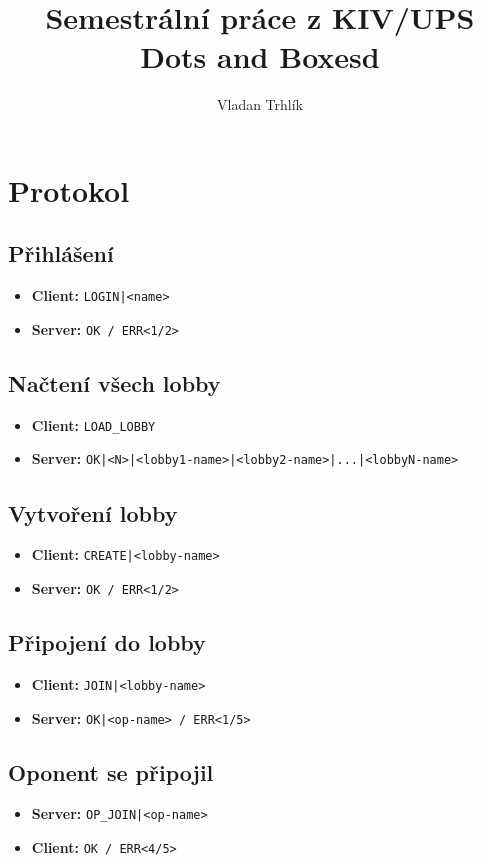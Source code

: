 \documentclass[11pt,a4paper]{article}
\author{Vladan Trhlík}
\title{%
	Semestrální práce z KIV/UPS \\
	\large Dots and Boxesd  \\
}
\begin{document}
\maketitle

\section{Protokol}

\subsection*{Přihlášení}
\begin{itemize}
	\item \textbf{Client:} \texttt{LOGIN|<name>}
	\item \textbf{Server:} \texttt{OK / ERR<1/2>}
\end{itemize}

\subsection*{Načtení všech lobby}
\begin{itemize}
	\item \textbf{Client:} \texttt{LOAD\_LOBBY}
	\item \textbf{Server:} \texttt{OK|<N>|<lobby1-name>|<lobby2-name>|...|<lobbyN-name>}
\end{itemize}

\subsection*{Vytvoření lobby}
\begin{itemize}
	\item \textbf{Client:} \texttt{CREATE|<lobby-name>}
	\item \textbf{Server:} \texttt{OK / ERR<1/2>}
\end{itemize}

\subsection*{Připojení do lobby}
\begin{itemize}
	\item \textbf{Client:} \texttt{JOIN|<lobby-name>}
	\item \textbf{Server:} \texttt{OK|<op-name> / ERR<1/5>}
\end{itemize}

\subsection*{Oponent se připojil}
\begin{itemize}
	\item \textbf{Server:} \texttt{OP\_JOIN|<op-name>}
	\item \textbf{Client:} \texttt{OK / ERR<4/5>}
\end{itemize}
\end{document}
